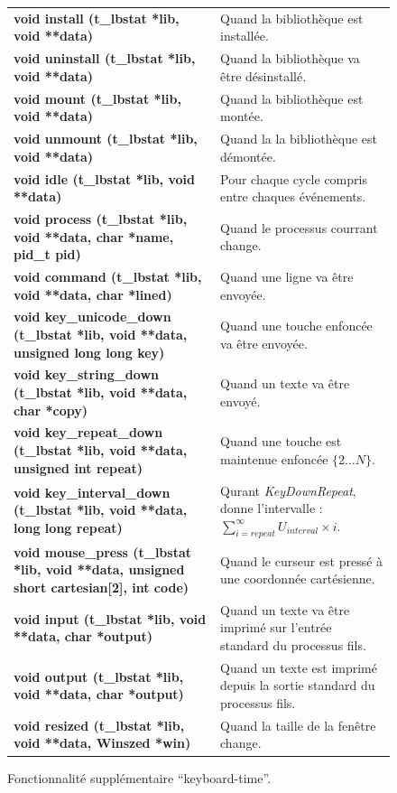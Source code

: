 \documentclass{report}
\newcommand{\violet}{\rowcolor{violet!10}}
\begin{document}
\begin{figure}[!ht]
    \begin{minipage}{\textwidth}
    \centering
        \begin{tabular}{p{}p{}}
            \textbf{void install (t\_lbstat *lib, void **data)} & Quand la bibliothèque est installée. \\
            \textbf{void uninstall (t\_lbstat *lib, void **data)} & Quand la bibliothèque va être désinstallé. \\
            \textbf{void mount (t\_lbstat *lib, void **data)} & Quand la bibliothèque est montée. \\
            \textbf{void unmount (t\_lbstat *lib, void **data)} & Quand la la bibliothèque est démontée. \\
            \textbf{void idle (t\_lbstat *lib, void **data)} & Pour chaque cycle compris entre chaques événements. \\
            \textbf{void process (t\_lbstat *lib, void **data, char *name, pid\_t pid)} & Quand le processus courrant change. \\
            \textbf{void command (t\_lbstat *lib, void **data, char *lined)} & Quand une ligne va être envoyée. \\
            \textbf{void key\_unicode\_down (t\_lbstat *lib, void **data, unsigned long long key)} & Quand une touche enfoncée va être envoyée. \\
            \textbf{void key\_string\_down (t\_lbstat *lib, void **data, char *copy)} & Quand un texte va être envoyé. \\
            \violet
            \textbf{void key\_repeat\_down (t\_lbstat *lib, void **data, unsigned int repeat)} & Quand une touche est maintenue enfoncée $\{2\dots{}N\}$. \\
            \violet
            \textbf{void key\_interval\_down (t\_lbstat *lib, void **data, long long repeat)} & Qurant \textit{KeyDownRepeat}, donne l'intervalle : $\sum_{i=repeat}^{\infty} U_{interval}\times{}i$. \\
            \textbf{void mouse\_press (t\_lbstat *lib, void **data, unsigned short cartesian[2], int code)} & Quand le curseur est pressé à une coordonnée cartésienne. \\
            \textbf{void input (t\_lbstat *lib, void **data, char *output)} & Quand un texte va être imprimé sur l'entrée standard du processus fils. \\
            \textbf{void output (t\_lbstat *lib, void **data, char *output)} & Quand un texte est imprimé depuis la sortie standard du processus fils. \\
            \textbf{void resized (t\_lbstat *lib, void **data, Winszed *win)} & Quand la taille de la fenêtre change. \\
        \end{tabular}
    \end{minipage}
   \caption[Caption]{ \colorbox{violet!10}{\phantom{\_}} Fonctionnalité supplémentaire \enquote{keyboard-time}.}
\end{figure}
\end{document}
